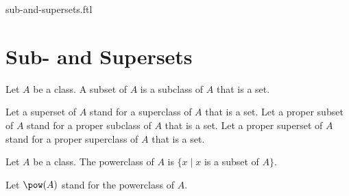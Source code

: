 \documentclass{naproche-library}
\begin{document}
\begin{smodule}{sub-and-supersets.ftl}


  \section*{Sub- and Supersets}

  \begin{definition}[forthel,id=FOUNDATIONS_10_1346889551183872]
    Let $A$ be a class.
    A subset of $A$ is a subclass of $A$ that is a set.

    Let a superset of $A$ stand for a superclass of $A$ that is a set.
    Let a proper subset of $A$ stand for a proper subclass of $A$ that is a set.
    Let a proper superset of $A$ stand for a proper superclass of $A$ that is a set.
  \end{definition}

  \begin{definition}[forthel,id=FOUNDATIONS_10_1448589907722240]
    Let $A$ be a class.
    The powerclass of $A$ is $\{ x \mid x$ is a subset of $A \}$.

    Let $\pow(A)$ stand for the powerclass of $A$.
  \end{definition}
\end{smodule}
\end{document}
